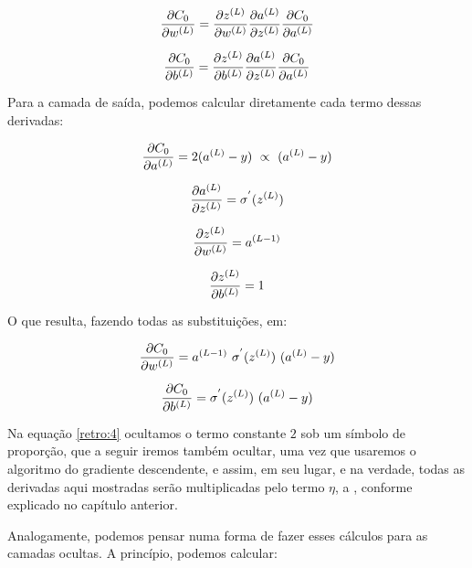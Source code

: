 \begin{equation}\label{retro:1}
\frac{\partial C_0}{\partial w^{(L)}} = \frac{\partial z^{(L)}}{\partial w^{(L)}} \frac{\partial a^{(L)}}{\partial z^{(L)}} \frac{\partial C_0}{\partial a^{(L)}}
\end{equation}

\begin{equation}\label{retro:2}
\frac{\partial C_0}{\partial b^{(L)}} = \frac{\partial z^{(L)}}{\partial b^{(L)}} \frac{\partial a^{(L)}}{\partial z^{(L)}} \frac{\partial C_0}{\partial a^{(L)}}
\end{equation}

Para a camada de saída, podemos calcular diretamente cada termo dessas derivadas:

\begin{equation}\label{retro:4}
\frac{\partial C_0}{\partial a^{(L)}} = 2(a^{(L)} - y) ~\propto~ (a^{(L)} - y)
\end{equation}

\begin{equation}\label{retro:5}
\frac{\partial a^{(L)}}{\partial z^{(L)}} = \sigma^{'}(z^{(L)})
\end{equation}

\begin{equation}\label{retro:6}
\frac{\partial z^{(L)}}{\partial w^{(L)}} = a^{(L-1)}
\end{equation}

\begin{equation}\label{retro:7}
\frac{\partial z^{(L)}}{\partial b^{(L)}} = 1
\end{equation}

O que resulta, fazendo todas as substituições, em:

\begin{equation}\label{retro:10}
\frac{\partial C_0}{\partial w^{(L)}} = a^{(L-1)}~ \sigma^{'}(z^{(L)})~ (a^{(L)} - y)
\end{equation}

\begin{equation}\label{retro:11}
\frac{\partial C_0}{\partial b^{(L)}} = \sigma^{'}(z^{(L)})~ (a^{(L)} - y)
\end{equation}

Na equação \ref{retro:4} ocultamos o termo constante $2$ sob um símbolo de proporção, que a seguir iremos também ocultar, uma vez que usaremos o algoritmo do gradiente descendente, e assim, em seu lugar, e na verdade, todas as derivadas aqui mostradas serão multiplicadas pelo termo $\eta$, a , conforme explicado no capítulo anterior. 

Analogamente, podemos pensar numa forma de fazer esses cálculos para as camadas ocultas. A princípio, podemos calcular:

